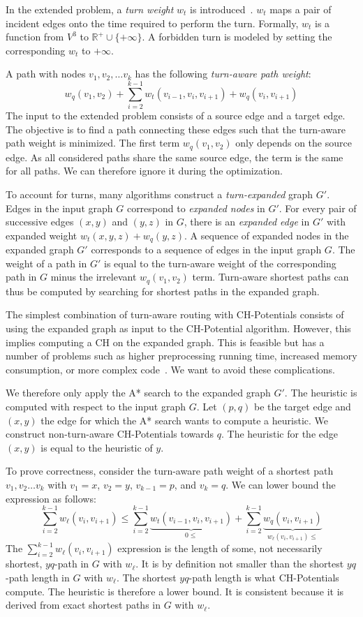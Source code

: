 \documentclass[letterpaper]{article} %
\begin{document}
In the extended problem, a \emph{turn weight} $w_t$ is introduced~\cite{gv-errnt-11,dgpw-crprn-13,bwzz-cchtc-20}.
$w_t$ maps a pair of incident edges onto the time required to perform the turn.
Formally, $w_t$ is a function from $V^3$ to $\mathbb{R}^+ \cup \{+\infty\}$.
A forbidden turn is modeled by setting the corresponding $w_t$ to $+\infty$.

A path with nodes $v_1, v_2,\ldots v_k$ has the following \emph{turn-aware path weight}:\[
w_q(v_1, v_2) + \sum_{i=2}^{k-1}  w_t(v_{i-1},v_i,v_{i+1})  + w_q(v_i,v_{i+1})
\] The input to the extended problem consists of a source edge and a target edge.
The objective is to find a path connecting these edges such that the turn-aware path weight is minimized.
The first term $w_q(v_1, v_2)$ only depends on the source edge.
As all considered paths share the same source edge, the term is the same for all paths.
We can therefore ignore it during the optimization.

To account for turns, many algorithms construct a \emph{turn-expanded} graph $G'$.
Edges in the input graph $G$ correspond to \emph{expanded nodes} in $G'$.
For every pair of successive edges $(x,y)$ and $(y,z)$ in $G$, there is an \emph{expanded edge} in $G'$ with expanded weight $w_t(x,y,z) + w_q(y,z)$.
A sequence of expanded nodes in the expanded graph $G'$ corresponds to a sequence of edges in the input graph $G$.
The weight of a path in $G'$ is equal to the turn-aware weight of the corresponding path in $G$ minus the irrelevant $w_q(v_1,v_2)$ term.
Turn-aware shortest paths can thus be computed by searching for shortest paths in the expanded graph.

The simplest combination of turn-aware routing with CH-Potentials consists of using the expanded graph as input to the CH-Potential algorithm.
However, this implies computing a CH on the expanded graph.
This is feasible but has a number of problems such as higher preprocessing running time, increased memory consumption, or more complex code~\cite{gv-errnt-11}.
We want to avoid these complications.

We therefore only apply the A* search to the expanded graph $G'$.
The heuristic is computed with respect to the input graph $G$.
Let $(p,q)$ be the target edge and $(x,y)$ the edge for which the A* search wants to compute a heuristic.
We construct non-turn-aware CH-Potentials towards $q$.
The heuristic for the edge $(x,y)$ is equal to the heuristic of $y$.

To prove correctness, consider the turn-aware path weight of a shortest path $v_1,v_2\ldots v_k$ with $v_1=x$, $v_2=y$, $v_{k-1}=p$, and $v_k=q$.
We can lower bound the expression as follows:
\[
\sum_{i=2}^{k-1} w_\ell(v_i,v_{i+1}) \le \sum_{i=2}^{k-1} \underbrace{w_t(v_{i-1},v_i,v_{i+1})}_{0\le} + \sum_{i=2}^{k-1} \underbrace{w_q(v_i,v_{i+1})}_{w_\ell(v_i,v_{i+1})\le}
\]
The $\sum_{i=2}^{k-1} w_\ell(v_i,v_{i+1})$ expression is the length of some, not necessarily shortest, $yq$-path in $G$ with $w_\ell$.
It is by definition not smaller than the shortest $yq$-path length in $G$ with $w_\ell$.
The shortest $yq$-path length is what CH-Potentials compute.
The heuristic is therefore a lower bound.
It is consistent because it is derived from exact shortest paths in $G$ with $w_\ell$.
\end{document}
